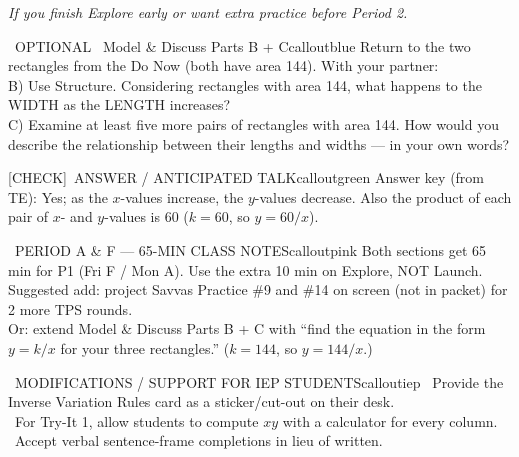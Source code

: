 \documentclass[11pt]{article}
\newcommand{\IconCheck}{[CHECK]}
\newcommand{\teacheranswerbox}[2]{%
  \begin{callout}{#1}{calloutgreen}
  #2
  \end{callout}
}
\begin{document}
\textit{If you finish Explore early or want extra practice before Period 2.}

\begin{callout}{\IconSearch\ OPTIONAL \textperiodcentered\ Model \& Discuss Parts B + C}{calloutblue}
Return to the two rectangles from the Do Now (both have area 144). With your partner:\\

B) Use Structure. Considering rectangles with area 144, what happens to the WIDTH as the LENGTH increases?\\

C) Examine at least five more pairs of rectangles with area 144. How would you describe the relationship between their lengths and widths --- in your own words?
\end{callout}


\teacheranswerbox{\IconCheck\ ANSWER / ANTICIPATED TALK}{%
Answer key (from TE): Yes; as the \(x\)-values increase, the \(y\)-values decrease. Also the product of each pair of \(x\)- and \(y\)-values is 60 (\(k = 60\), so \(y = 60/x\)).
}

\clearpage

\begin{callout}{\IconClock\ PERIOD A \& F --- 65-MIN CLASS NOTES}{calloutpink}
Both sections get 65 min for P1 (Fri F / Mon A). Use the extra 10 min on Explore, NOT Launch.\\
Suggested add: project Savvas Practice \#9 and \#14 on screen (not in packet) for 2 more TPS rounds.\\
Or: extend Model \& Discuss Parts B + C with ``find the equation in the form \(y = k/x\) for your three rectangles.'' (\(k = 144\), so \(y = 144/x\).)
\end{callout}

\begin{callout}{\IconPuzzle\ MODIFICATIONS / SUPPORT FOR IEP STUDENTS}{calloutiep}
\textbullet\ Provide the Inverse Variation Rules card as a sticker/cut-out on their desk.\\
\textbullet\ For Try-It 1, allow students to compute \(xy\) with a calculator for every column.\\
\textbullet\ Accept verbal sentence-frame completions in lieu of written.
\end{callout}
\end{document}
